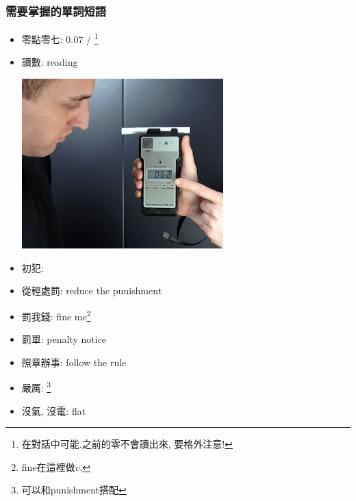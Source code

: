 \subsubsection*{需要掌握的單詞短語}
\begin{multicols}{2}
\begin{itemize}
  \itemsep0em
  \item 零點零七: 0.07 / \footnote{在對話中可能.之前的零不會讀出來, 要格外注意!}
  \item 讀數: reading
  \begin{center}
  	\includegraphics[scale=.6]{pics/rbt-reading}
  \end{center}
  \item 初犯: 
  \item 從輕處罰: reduce the punishment
  \item 罰我錢: fine me\footnote{fine在這裡做$v.$}
  \item 罰單: penalty notice
  \item 照章辦事: follow the rule
  \item 嚴厲: \footnote{可以和punishment搭配}
  \item 沒氣, 沒電: flat
\end{itemize}
\end{multicols}

